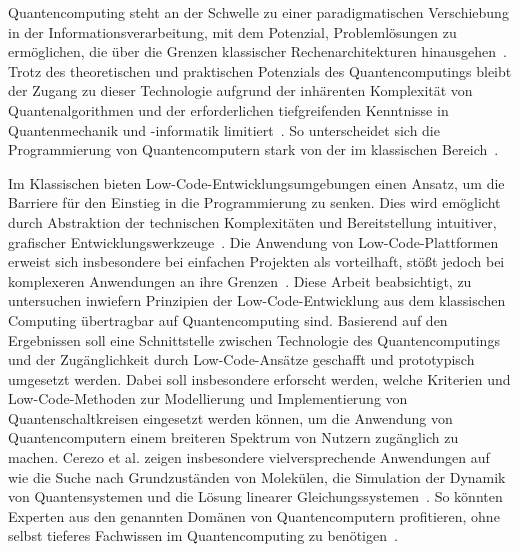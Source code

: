 Quantencomputing steht an der Schwelle zu einer paradigmatischen
Verschiebung in der Informationsverarbeitung, mit dem Potenzial,
Problemlösungen zu ermöglichen, die über die Grenzen klassischer
Rechenarchitekturen hinausgehen~\cite{Shor1999}. Trotz des theoretischen und
praktischen Potenzials des Quantencomputings bleibt der Zugang zu dieser
Technologie aufgrund der inhärenten Komplexität von Quantenalgorithmen
und der erforderlichen tiefgreifenden Kenntnisse in Quantenmechanik und
-informatik limitiert~\cite{Chitransh2022}. So unterscheidet sich die Programmierung
von Quantencomputern stark von der im klassischen Bereich~\cite{Rieffel2011}.

Im Klassischen bieten Low-Code-Entwicklungsumgebungen einen Ansatz, um
die Barriere für den Einstieg in die Programmierung zu senken. Dies wird
emöglicht durch Abstraktion der technischen Komplexitäten und
Bereitstellung intuitiver, grafischer Entwicklungswerkzeuge~\cite{Juhas2022}. Die
Anwendung von Low-Code-Plattformen erweist sich insbesondere bei
einfachen Projekten als vorteilhaft, stößt jedoch bei komplexeren
Anwendungen an ihre Grenzen~\cite{Buscher2022}. Diese Arbeit beabsichtigt, zu
untersuchen inwiefern Prinzipien der Low-Code-Entwicklung aus dem
klassischen Computing übertragbar auf Quantencomputing sind. Basierend
auf den Ergebnissen soll eine Schnittstelle zwischen Technologie des
Quantencomputings und der Zugänglichkeit durch Low-Code-Ansätze
geschafft und prototypisch umgesetzt werden. Dabei soll insbesondere
erforscht werden, welche Kriterien und Low-Code-Methoden zur
Modellierung und Implementierung von Quantenschaltkreisen eingesetzt
werden können, um die Anwendung von Quantencomputern einem breiteren
Spektrum von Nutzern zugänglich zu machen. Cerezo et al. zeigen
insbesondere vielversprechende Anwendungen auf wie die Suche nach
Grundzuständen von Molekülen, die Simulation der Dynamik von
Quantensystemen und die Lösung linearer Gleichungssystemen~\cite{Cerezo2021}. So
könnten Experten aus den genannten Domänen von Quantencomputern
profitieren, ohne selbst tieferes Fachwissen im Quantencomputing zu
benötigen~\cite{Motta2022}.